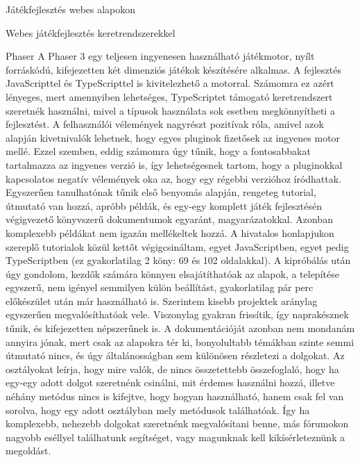 \begin{MyChapter}{Játékfejlesztés webes alapokon}
\begin{MySection}{Webes játékfejlesztés keretrendszerekkel}
		\begin{MySubSection}{Phaser}
			A Phaser 3 egy teljesen ingyenesen használható játékmotor, nyílt forráskódú, kifejezetten két dimenziós játékok készítésére alkalmas. A fejlesztés JavaScripttel és TypeScripttel is kivitelezhető a motorral. Számomra ez azért lényeges, mert amennyiben lehetséges, TypeScriptet támogató keretrendszert szeretnék használni, mivel a típusok használata sok esetben megkönnyítheti a fejlesztést.
			A felhasználói vélemények nagyrészt pozitívak róla, amivel azok alapján kivetnivalók lehetnek, hogy egyes pluginok fizetősek az ingyenes motor mellé. Ezzel szemben, eddig számomra úgy tűnik, hogy a fontosabbakat tartalmazza az ingyenes verzió is, így lehetségesnek tartom, hogy a pluginokkal kapcsolatos negatív vélemények oka az, hogy egy régebbi verzióhoz íródhattak.
			Egyszerűen tanulhatónak tűnik első benyomás alapján, rengeteg tutorial, útmutató van hozzá, apróbb példák, és egy-egy komplett játék fejlesztésén végigvezető könyvszerű dokumentumok egyaránt, magyarázatokkal. Azonban komplexebb példákat nem igazán mellékeltek hozzá.
			A hivatalos honlapjukon szereplő tutorialok közül kettőt végigcsináltam, egyet JavaScriptben, egyet pedig TypeScriptben (ez gyakorlatilag 2 köny: 69 és 102 oldalakkal). 
			A kipróbálás után úgy gondolom, kezdők számára könnyen elsajátíthatóak az alapok, a telepítése egyszerű, nem igényel semmilyen külön beállítást, gyakorlatilag pár perc előkészület után már használható is.
			Szerintem kisebb projektek aránylag egyszerűen megvalósíthatóak vele.
			Viszonylag gyakran frissítik, így naprakésznek tűnik, és kifejezetten népszerűnek is.
			A dokumentációját azonban nem mondanám annyira jónak, mert csak az alapokra tér ki, bonyolultabb témákban szinte semmi útmutató nincs, és úgy általánosságban sem különösen részletezi a dolgokat. Az osztályokat leírja, hogy mire valók, de nincs összetettebb összefoglaló, hogy ha egy-egy adott dolgot szeretnénk csinálni, mit érdemes használni hozzá, illetve néhány metódus nincs is kifejtve, hogy hogyan használható, hanem csak fel van sorolva, hogy egy adott osztályban mely metódusok találhatóak. Így ha komplexebb, nehezebb dolgokat szeretnénk megvalósítani benne, más fórumokon nagyobb eséllyel találhatunk segítséget, vagy magunknak kell kikísérleteznünk a megoldást.
		\end{MySubSection}
			

\end{MySection}
\end{MyChapter}
